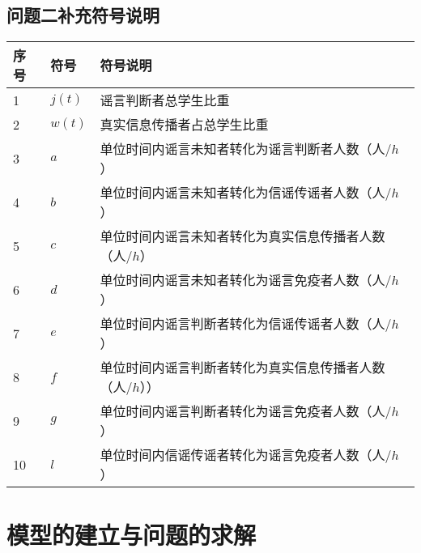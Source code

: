 \documentclass[withoutpreface,bwprint]{cumcmthesis}
\newcommand{\headcol}[1]{\textbf{#1}} %
\begin{document}
\subsection{问题二补充符号说明}
\begin{table}[htb!]
	\centering
	\small
	\begin{tabular}{p{60pt}<{\centering}|p{60pt}<{\centering}p{180pt}<{\raggedright}}
		\hline
		\headcol 序号 & 符号 & 符号说明 \\
		\hline
		1 & $j(t)$ & 谣言判断者总学生比重 \\
		2 & $w(t)$ & 真实信息传播者占总学生比重\\
		3 & $a$ & 单位时间内谣言未知者转化为谣言判断者人数（人/$h$）\\
		4 & $b$ &单位时间内谣言未知者转化为信谣传谣者人数（人/$h$） \\
		5 & $c$ & 单位时间内谣言未知者转化为真实信息传播者人数（人/$h$） \\
		6 & $d$& 单位时间内谣言未知者转化为谣言免疫者人数（人/$h$）\\
		7 & $e$& 单位时间内谣言判断者转化为信谣传谣者人数（人/$h$）\\
		8 & $f$ & 单位时间内谣言判断者转化为真实信息传播者人数（人/$h$）） \\
		9 & $g$ & 单位时间内谣言判断者转化为谣言免疫者人数（人/$h$）  \\
		10 & $l$ & 单位时间内信谣传谣者转化为谣言免疫者人数（人/$h$）  \\
		\hline
	\end{tabular}
	\label{symbol2}
\end{table}



 \newpage
\section{模型的建立与问题的求解}
\end{document}
